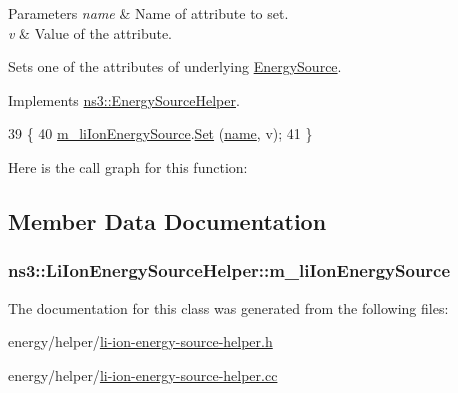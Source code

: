 \begin{DoxyParams}{Parameters}
{\em name} & Name of attribute to set. \\
\hline
{\em v} & Value of the attribute.\\
\hline
\end{DoxyParams}
Sets one of the attributes of underlying \hyperlink{classns3_1_1EnergySource}{Energy\+Source}. 

Implements \hyperlink{classns3_1_1EnergySourceHelper_ace926f92f679fac7fe7188c9c144ef4a}{ns3\+::\+Energy\+Source\+Helper}.


\begin{DoxyCode}
39 \{
40   \hyperlink{classns3_1_1LiIonEnergySourceHelper_a2491ef890cd9907ec93b27dee01c7c19}{m\_liIonEnergySource}.\hyperlink{classns3_1_1ObjectFactory_aef5c0d5019c96bdf01cefd1ff83f4a68}{Set} (\hyperlink{generate__test__data__lte__spectrum__model_8m_ab74e6bf80237ddc4109968cedc58c151}{name}, v);
41 \}
\end{DoxyCode}


Here is the call graph for this function\+:




\subsection{Member Data Documentation}
\subsubsection[{\texorpdfstring{m\+\_\+li\+Ion\+Energy\+Source}{m_liIonEnergySource}}]{ ns3\+::\+Li\+Ion\+Energy\+Source\+Helper\+::m\+\_\+li\+Ion\+Energy\+Source\hspace{0.3cm}{\ttfamily [private]}}\hypertarget{classns3_1_1LiIonEnergySourceHelper_a2491ef890cd9907ec93b27dee01c7c19}{}\label{classns3_1_1LiIonEnergySourceHelper_a2491ef890cd9907ec93b27dee01c7c19}


The documentation for this class was generated from the following files\+:\begin{DoxyCompactItemize}
\item 
energy/helper/\hyperlink{li-ion-energy-source-helper_8h}{li-\/ion-\/energy-\/source-\/helper.\+h}\item 
energy/helper/\hyperlink{li-ion-energy-source-helper_8cc}{li-\/ion-\/energy-\/source-\/helper.\+cc}\end{DoxyCompactItemize}
